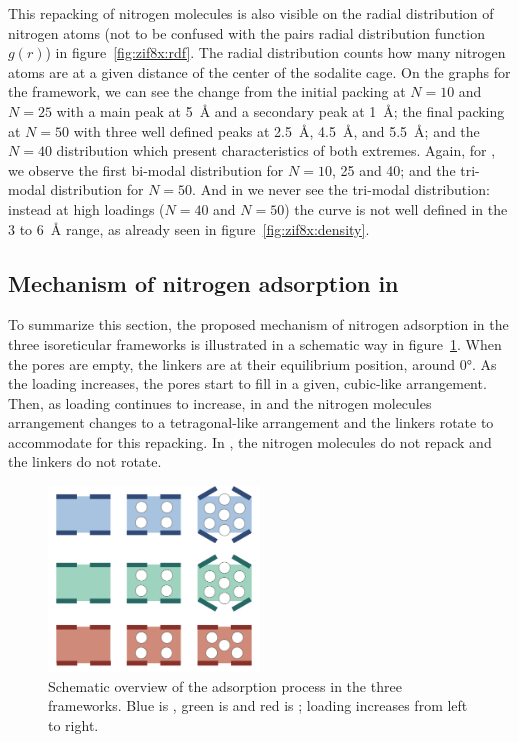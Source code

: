 \documentclass[thesis]{subfiles}
\begin{document}
This repacking of nitrogen molecules is also visible on the radial distribution
of nitrogen atoms (not to be confused with the pairs radial distribution
function $g(r)$) in figure~\ref{fig:zif8x:rdf}. The radial distribution counts
how many nitrogen atoms are at a given distance of the center of the sodalite
cage. On the graphs for the  framework, we can see the change from the
initial packing at $N = 10$ and $N = 25$ with a main peak at \SI{5}{\AA} and a
secondary peak at \SI{1}{\AA}; the final packing at $N = 50$ with three well
defined peaks at \SI{2.5}{\AA}, \SI{4.5}{\AA}, and \SI{5.5}{\AA}; and the $N =
40$ distribution which present characteristics of both extremes. Again, for
\ZIFCl, we observe the first bi-modal distribution for $N = 10$, 25 and 40; and
the tri-modal distribution for $N = 50$. And in \ZIFBr we never see the
tri-modal distribution: instead at high loadings ($N = 40$ and $N = 50$) the
curve is not well defined in the 3 to \SI{6}{\AA} range, as already seen in
figure~\ref{fig:zif8x:density}.

\subsection{Mechanism of nitrogen adsorption in }

To summarize this section, the proposed mechanism of nitrogen adsorption in the
three isoreticular  frameworks is illustrated in a schematic way in
figure~\ref{fig:zif8x:summary}. When the pores are empty, the linkers are at
their equilibrium position, around 0°. As the loading increases, the pores start
to fill in a given, cubic-like arrangement. Then, as loading continues to
increase, in  and \ZIFCl the nitrogen molecules arrangement changes to a
tetragonal-like arrangement and the linkers rotate to accommodate for this
repacking. In \ZIFBr, the nitrogen molecules do not repack and the linkers do
not rotate.

\begin{figure}[ht]
    \centering
    \includegraphics[width=0.5\textwidth]{figures/images/zif8x-summary}
    \caption{Schematic overview of the adsorption process in the three 
    frameworks. Blue is , green is \ZIFCl and red is \ZIFBr; loading
    increases from left to right.}
    \label{fig:zif8x:summary}
\end{figure}
\end{document}
